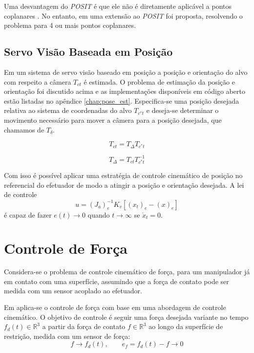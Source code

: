 Uma desvantagem do \textit{POSIT} é que ele não é diretamente aplicável a pontos coplanares \citep{marchand2016pose}. No entanto, em \citep{oberkampf1996iterative} uma extensão ao \textit{POSIT} foi proposta, resolvendo o problema para 4 ou mais pontos coplanares. 



\subsection{Servo Visão Baseada em Posição}
Em um sistema de servo visão baseado em posição a posição e orientação do alvo com respeito a câmera ${T}_{ct}$ é estimada. O problema de estimação da posição e orientação foi discutido acima e as implementações disponíveis em código aberto estão listadas no apêndice \ref{chap:pose_est}.
Especifica-se uma posição desejada relativa ao sistema de coordenadas do alvo  ${T}_{c^*t}$ e deseja-se determinar o movimento necessário para mover a câmera para a posição desejada, que chamamos de ${T}_\delta$.

\begin{equation}
 {T}_{ct} =  {T}_\Delta {T}_{c^*t}
\end{equation}

\begin{equation}
 {T}_\Delta  =   {T}_{ct} {T}_{c^*t}^{-1}
\end{equation}

Com isso é possível aplicar uma estratégia de controle cinemático de posição no referencial do efetuador de modo a atingir a posição e orientação desejada. A lei de controle
\begin{equation}
{u} = ({J}_a)_e^{-1}{K}_v[({x}_t)_e - ({x})_e]
\end{equation}
é capaz de fazer ${e}(t) \rightarrow 0$ quando $t \rightarrow \infty$ se $\dot{{x}}_t = 0$.

\section{Controle de Força}
Considera-se o problema de controle cinemático de força, para um manipulador já em contato com uma superfície, assumindo que a força de contato pode ser medida com um sensor acoplado ao efetuador. 

Em \citep{leite2011servo} aplica-se o controle de força com base em uma abordagem de controle cinemático. O objetivo de controle é seguir uma força desejada variante no tempo ${f}_d(t) \in \mathbb{R}^3$ a partir da força de contato ${f} \in \mathbb{R}^3$ ao longo da superfície de restrição, medida com um sensor de força:
\begin{equation} \label{eq:problema_ctrl_forca}
{f} \rightarrow {f}_d(t), \qquad {e}_f = {f}_d(t) - {f} \rightarrow 0
\end{equation}

